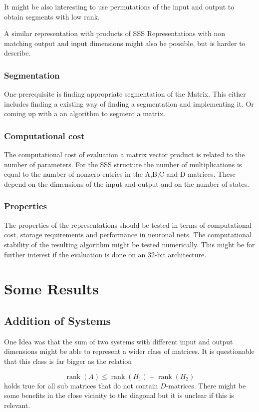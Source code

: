 \documentclass[lang=ngerman,inputenc=utf8,fontsize=10pt]{ldvarticle}
\DeclareMathOperator{\rank}{rank}
\begin{document}
It might be also interesting to use permutations of the input and output to obtain segments with low rank.

A similar representation with products of SSS Representations with non matching output and input dimensions might also be possible, but is harder to describe.

\subsubsection*{Segmentation}
One prerequisite is finding appropriate segmentation of the Matrix. This either includes finding a existing way of finding a segmentation and implementing it.
Or coming up with a an algorithm to segment a matrix.

\subsubsection*{Computational cost}
The computational cost of evaluation a matrix vector product is related to the number of parameters.
For the SSS structure the number of multiplications is equal to the number of nonzero entries in the A,B,C and D matrices. These depend on the dimensions of the input and output and on the number of states.

\subsubsection*{Properties}
The properties of the representations should be tested in terms of computational cost, storage requirements and performance in neuronal nets.
The computational stability of the resulting algorithm might be tested numerically. This might be for further interest if the evaluation is done on an 32-bit architecture.

\section*{Some Results}

\subsection*{Addition of Systems}
One Idea was that the sum of two systems with different input and output dimensions might be able to represent a wider class of matrices.
It is questionable that this class is far bigger as the relation 

\begin{equation}
	\rank(A) \leq \rank(H_1) + \rank(H_2) 
\end{equation}
holds true for all sub matrices that do not contain $D$-matrices.
There might be some benefits in the close vicinity to the diagonal but it is unclear if this is relevant.
\end{document}
